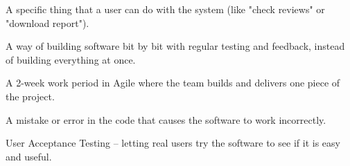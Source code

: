\documentclass[10pt, a4paper]{report}
\begin{document}
\begin{description}[leftmargin=3cm]
  \item[Use Case] A specific thing that a user can do with the system (like "check reviews" or "download report").
  \item[Agile] A way of building software bit by bit with regular testing and feedback, instead of building everything at once.
  \item[Sprint] A 2-week work period in Agile where the team builds and delivers one piece of the project.
  \item[Bug] A mistake or error in the code that causes the software to work incorrectly.
  \item[UAT] User Acceptance Testing -- letting real users try the software to see if it is easy and useful.
\end{description}
\end{document}
